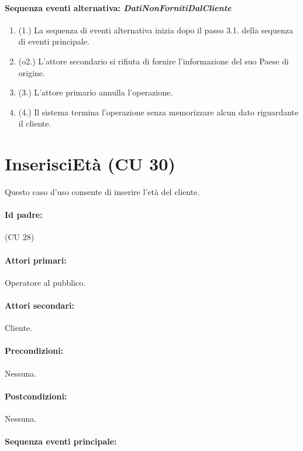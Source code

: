 \documentclass{article}
\begin{document}
	\paragraph{Sequenza eventi alternativa: \emph{DatiNonFornitiDalCliente}}
		\begin{enumerate}[itemsep=8pt,parsep=0pt]
				\item (1.) La sequenza di eventi alternativa inizia dopo il passo 3.1. della sequenza di eventi principale.
				\item (o2.) L'attore secondario si rifiuta di fornire l'informazione del suo Paese di origine.
				\item (3.) L'attore primario annulla l'operazione.
				\item (4.) Il sistema termina l'operazione senza memorizzare alcun dato riguardante il cliente.
		\end{enumerate}
	



	
\newpage	
\section*{InserisciEtà (CU 30)}
	
	\indent\indent Questo caso d'uso consente di inserire l'età del cliente.
	
	\paragraph{Id padre:} (CU 28)
	
	\paragraph{Attori primari:}Operatore al pubblico.
	
	\paragraph{Attori secondari:}Cliente.
	
	\paragraph{Precondizioni:}Nessuna.
	
	\paragraph{Postcondizioni:}Nessuna.
	
	\paragraph{Sequenza eventi principale:}
\end{document}
